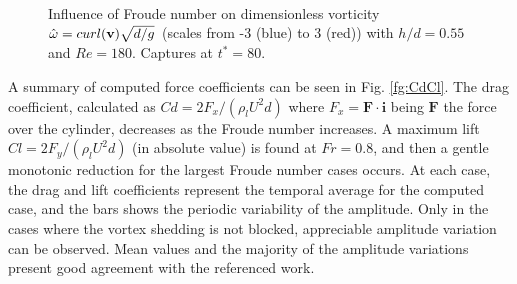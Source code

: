 \begin{figure}[htbp]
\begin{center}
{    } \\
 \\
 \\
  \end{center}
  \caption{Influence of Froude number on dimensionless vorticity $\hat\omega = curl(\mathbf{v}) \sqrt{d/g}$ (scales from -3 (blue) to 3 (red)) with $h/d = 0.55$ and $Re=180$. Captures at $t^*=80$.
}
\label{fg:vort_Re180} 
\end{figure}


A summary of computed force coefficients can be seen in Fig. \ref{fg:CdCl}. The drag coefficient, calculated as $Cd=2 F_x/(\rho_l U^2 d)$ where $F_x=\mathbf{F} \cdot \mathbf{i}$ being $\mathbf{F}$ the force over the cylinder, decreases as the Froude number increases. A maximum lift $Cl=2 F_y/(\rho_l U^2 d)$ (in absolute value) is found at $Fr = 0.8$, and then a gentle monotonic reduction for the largest Froude number cases occurs. At each case, the drag and lift coefficients represent the temporal average for the computed case, and the bars shows the periodic variability of the amplitude. Only in the cases where the vortex shedding is not blocked, appreciable amplitude variation can be observed. Mean values and the majority of the amplitude variations present good agreement with the referenced work.

